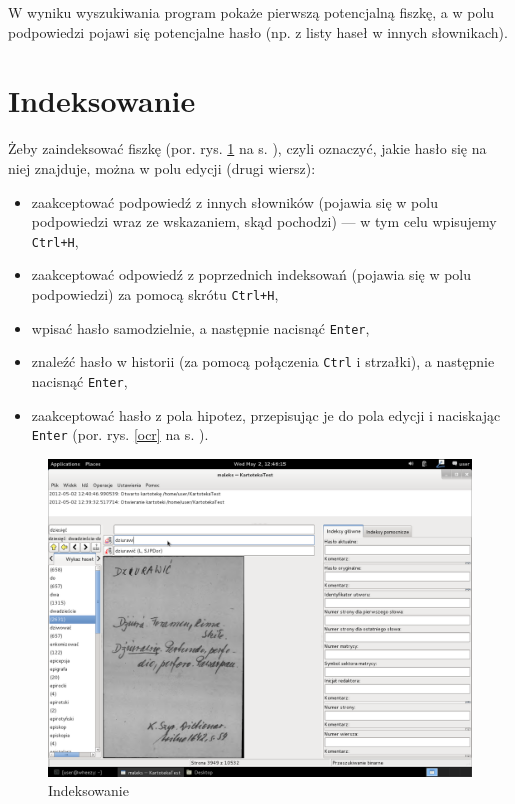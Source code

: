 \documentclass[12pt,oneside,notitlepage,titleauthor]{mwart}%
\begin{document}
W wyniku wyszukiwania program pokaże pierwszą potencjalną fiszkę, a w polu podpowiedzi pojawi się potencjalne hasło (np. z listy haseł w innych słownikach).


\section{Indeksowanie}
Żeby zaindeksować fiszkę (por. rys. \ref{04_indeksowanie} na s. \pageref{04_indeksowanie}), czyli oznaczyć, jakie hasło się na niej znajduje, można w polu edycji (drugi wiersz):

\begin{itemize}
\item zaakceptować podpowiedź z innych słowników (pojawia się w polu podpowiedzi wraz ze wskazaniem, skąd pochodzi) --- w tym celu wpisujemy \texttt{Ctrl+H},
\item zaakceptować odpowiedź z poprzednich indeksowań (pojawia się w polu podpowiedzi) za pomocą skrótu \texttt{Ctrl+H},
\item wpisać hasło samodzielnie, a następnie nacisnąć \texttt{Enter},
\item znaleźć hasło w historii (za pomocą połączenia \texttt{Ctrl} i strzałki), a następnie nacisnąć \texttt{Enter},
\item zaakceptować hasło z pola hipotez, przepisując je do pola edycji i naciskając \texttt{Enter} (por. rys. \ref{ocr} na s. \pageref{ocr}).
\end{itemize}

\begin{figure}[h]
\includegraphics[scale=0.3]{04_indeksowanie.png}
\caption{Indeksowanie}
\label{04_indeksowanie}
\end{figure}
\end{document}
